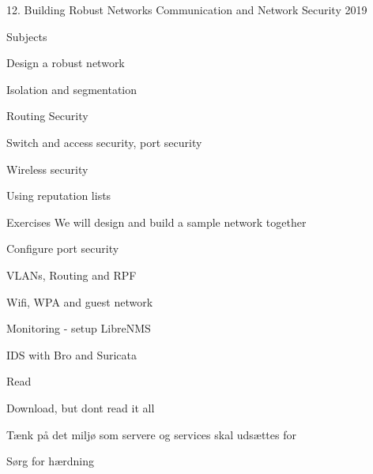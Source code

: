 \documentclass[Screen16to9,17pt]{foils}
\begin{document}
\mytitlepage
{12. Building Robust Networks}
{Communication and Network Security 2019}



\begin{list1}
\item Subjects
\begin{list2}
\item Design a robust network
\item Isolation and segmentation
\item Routing Security
\item Switch and access security, port security
\item Wireless security
\item Using reputation lists
\end{list2}
\item Exercises We will design and build a sample network together
\begin{list2}
\item Configure port security
\item VLANs, Routing and RPF
\item Wifi, WPA and guest network
\item Monitoring - setup LibreNMS
\item IDS with Bro and Suricata
\end{list2}
\end{list1}



\begin{list2}
\item Read
\item {\small {}}
\item {\small {}}
\item Download, but dont read it all\\{\small {}}
\end{list2}






\begin{list1}
\item Tænk på det miljø som servere og services skal udsættes for
\item Sørg for hærdning
\end{list1}
\end{document}
